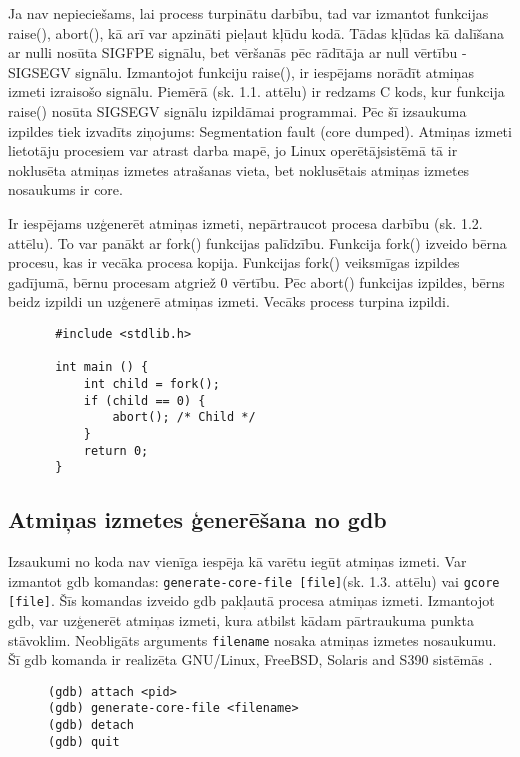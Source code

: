 Ja nav nepieciešams, lai process turpinātu darbību, tad var izmantot funkcijas raise(), abort(), kā arī var apzināti pieļaut kļūdu kodā.
Tādas kļūdas kā dalīšana ar nulli nosūta SIGFPE signālu, bet vēršanās pēc rādītāja ar null vērtību - SIGSEGV signālu.
Izmantojot funkciju raise(), ir iespējams norādīt atmiņas izmeti izraisošo signālu.
Piemērā (sk. 1.1. attēlu) ir redzams C kods, kur funkcija raise() nosūta SIGSEGV signālu izpildāmai programmai. 
Pēc šī izsaukuma izpildes tiek izvadīts ziņojums: Segmentation fault (core dumped).
Atmiņas izmeti lietotāju procesiem var atrast darba mapē, jo Linux operētājsistēmā tā ir noklusēta atmiņas izmetes atrašanas vieta, bet noklusētais atmiņas izmetes nosaukums ir core.

Ir iespējams uzģenerēt atmiņas izmeti, nepārtraucot procesa darbību (sk. 1.2. attēlu). 
To var panākt ar fork() funkcijas palīdzību. Funkcija fork() izveido bērna procesu, kas ir vecāka procesa kopija.
Funkcijas fork() veiksmīgas izpildes gadījumā, bērnu procesam atgriež 0 vērtību. 
Pēc abort() funkcijas izpildes, bērns beidz izpildi un uzģenerē atmiņas izmeti. Vecāks process turpina izpildi.


\begin{figure}[h]
\begin{lstlisting}
 #include <stdlib.h>

 int main () {
     int child = fork();
     if (child == 0) {
         abort(); /* Child */
     }
     return 0;
 }
 \end{lstlisting}
\caption{\textbf{\fontsize{11}{12}\selectfont {Atmiņas izmetes ģenerēšana, turpinot procesa darbību}}}
\end{figure}

\subsection{Atmiņas izmetes ģenerēšana no gdb}
Izsaukumi no koda nav vienīga iespēja kā varētu iegūt atmiņas izmeti. 
Var izmantot gdb komandas: \texttt{generate-core-file [file]}(sk. 1.3. attēlu) vai \texttt{gcore [file]}. Šīs komandas izveido gdb pakļautā procesa atmiņas izmeti. 
Izmantojot gdb, var uzģenerēt atmiņas izmeti, kura atbilst kādam pārtraukuma punkta stāvoklim. 
Neobligāts arguments \texttt{filename} nosaka atmiņas izmetes nosaukumu. Šī gdb komanda ir realizēta GNU/Linux, FreeBSD, Solaris and S390 sistēmās \cite {gdb_gen_core}.

\begin{figure}[h]
\begin{lstlisting}
(gdb) attach <pid>
(gdb) generate-core-file <filename>
(gdb) detach
(gdb) quit
 \end{lstlisting}
\caption{\textbf{\fontsize{11}{12}\selectfont {Atmiņas izmetes ģenerēšana, izmantojot gdb}}}
\end{figure}

